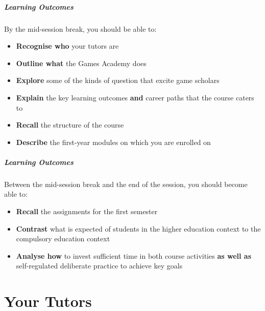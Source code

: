 \frame{\titlepage} 

\begin{frame}
	\frametitle{Learning Outcomes}
	
	By the mid-session break, you should be able to:
	
	\begin{itemize}
		\item \textbf{Recognise who} your tutors are
		\item \textbf{Outline what} the Games Academy does
		\item \textbf{Explore} some of the kinds of question that excite game scholars
		\item \textbf{Explain} the key learning outcomes \textbf{and} career paths that the course caters to
		\item \textbf{Recall} the structure of the course
		\item \textbf{Describe} the first-year modules on which you are enrolled on
	\end{itemize}
\end{frame}

\begin{frame}
	\frametitle{Learning Outcomes}
	
	Between the mid-session break and the end of the session, you should become able to:
	
	\begin{itemize}
		\item \textbf{Recall} the assignments for the first semester
		\item \textbf{Contrast} what is expected of students in the higher education context to the compulsory education context
		\item \textbf{Analyse how} to invest sufficient time in both course activities \textbf{as well as} self-regulated deliberate practice to achieve key goals
	\end{itemize}
\end{frame}

\part{Your Tutors}
\frame{\partpage}



